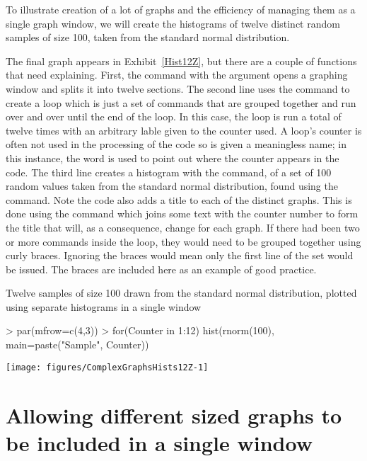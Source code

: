 To illustrate creation of a lot of graphs and the efficiency of managing them as a single graph window, we will create the histograms of twelve distinct random samples of size 100, taken from the standard normal distribution. 
 
The final graph appears in Exhibit~\ref{Hist12Z}, but there are a couple of functions that need explaining. First, the  command with the  argument opens a graphing window and splits it into twelve sections. The second line uses the  command to create a loop which is just a set of commands that are grouped together and run over and over until the end of the loop. In this case, the loop is run a total of twelve times with an arbitrary lable given to the counter used. A loop's counter is often not used in the processing of the code so is given a meaningless name; in this instance, the word  is used to point out where the counter appears in the code. The third line creates a histogram with the  command, of a set of 100 random values taken from the standard normal distribution, found using the  command. Note the code also adds a title to each of the distinct graphs. This is done using the  command which joins some text with the counter number to form the title that will, as a consequence, change for each graph. If there had been two or more commands inside the loop, they would need to be grouped together using curly braces. Ignoring the braces would mean only the first line of the set would be issued. The braces are included here as an example of good practice. 
 
\begin{exhibit} 
\begin{center} 
\caption{Twelve samples of size 100 drawn from the standard normal distribution, plotted using separate histograms in a single window} 
\label{Hists12Z} 
\begin{Schunk}
\begin{Sinput}
> par(mfrow=c(4,3)) 
> for(Counter in 1:12){ 
   hist(rnorm(100), main=paste("Sample", Counter))} 
\end{Sinput}

\texttt{[image: figures/ComplexGraphsHists12Z-1]} \end{Schunk}
\end{center} 
\end{exhibit} 
 
\section{Allowing different sized graphs to be included in a single window} 
 
